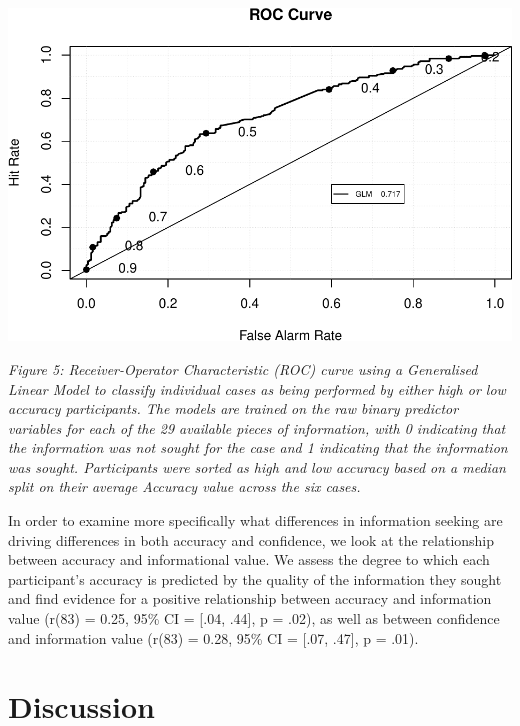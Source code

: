\documentclass[a4paper, nobind]{templates/ociamthesis}
\begin{document}
\includegraphics{_main_files/figure-latex/accuracyClassifier-1.pdf}

\emph{Figure 5: Receiver-Operator Characteristic (ROC) curve using a Generalised Linear Model to classify individual cases as being performed by either high or low accuracy participants. The models are trained on the raw binary predictor variables for each of the 29 available pieces of information, with 0 indicating that the information was not sought for the case and 1 indicating that the information was sought. Participants were sorted as high and low accuracy based on a median split on their average Accuracy value across the six cases.}

In order to examine more specifically what differences in information seeking are driving differences in both accuracy and confidence, we look at the relationship between accuracy and informational value. We assess the degree to which each participant's accuracy is predicted by the quality of the information they sought and find evidence for a positive relationship between accuracy and information value (r(83) = 0.25, 95\% CI = {[}.04, .44{]}, p = .02), as well as between confidence and information value (r(83) = 0.28, 95\% CI = {[}.07, .47{]}, p = .01).

\hypertarget{discussion}{%
\section*{Discussion}\label{discussion}}
\end{document}
